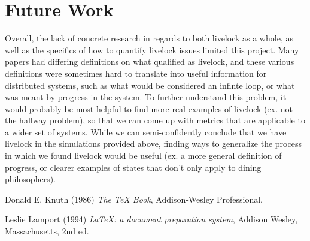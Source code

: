 \documentclass{article}
\begin{document}
\section{Future Work} %
Overall, the lack of concrete research in regards to both livelock as a whole, as well as the specifics of how to quantify 
livelock issues limited this project.  Many papers had differing definitions on what qualified as livelock, and these various
definitions were sometimes hard to translate into useful information for distributed systems, such as what would 
be considered an infinte loop, or what was meant by progress in the system.  To further understand this problem, it would 
probably be most helpful to find more real examples of livelock (ex. not the hallway problem), so that we can come up with 
metrics that are applicable to a wider set of systems.  While we can semi-confidently conclude that we have livelock in 
the simulations provided above, finding ways to generalize the process in which we found livelock would be useful 
(ex. a more general definition of progress, or clearer examples of states that don't only apply to dining philosophers).

\begin{thebibliography}{9}
Donald E. Knuth (1986) \emph{The \TeX{} Book}, Addison-Wesley Professional.

Leslie Lamport (1994) \emph{\LaTeX: a document preparation system}, Addison
Wesley, Massachusetts, 2nd ed.
\end{thebibliography}
\end{document}
